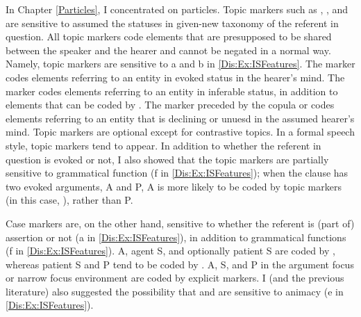 In Chapter \ref{Particles},
I concentrated on particles.
Topic markers such as , , and 
are sensitive to assumed the statuses in given-new taxonomy of the referent in question.
All topic markers code elements that are presupposed to be
shared between the speaker and the hearer
and cannot be negated in a normal way.
Namely, topic markers are sensitive to
a and b in \ref{Dis:Ex:ISFeatures}.
The marker  codes elements referring to an entity in evoked status in the hearer's mind.
The marker  codes elements referring to an entity in inferable status,
in addition to elements that can be coded by .
The marker  preceded by the copula  or 
codes elements referring to an entity that is declining or unuesd in the assumed hearer's mind.
Topic markers are optional except for contrastive topics.
In a formal speech style,
topic markers tend to appear.
In addition to whether the referent in question is evoked or not,
I also showed that the topic markers are partially sensitive to grammatical function (f in \ref{Dis:Ex:ISFeatures});
when the clause has two evoked arguments, A and P,
A is more likely to be coded by topic markers (in this case, ),
rather than P.

Case markers are, on the other hand, sensitive to whether the referent is (part of) assertion or not (a in \ref{Dis:Ex:ISFeatures}),
in addition to grammatical functions (f in \ref{Dis:Ex:ISFeatures}).
A, agent S, and optionally patient S are coded by ,
whereas patient S and P tend to be coded by \ci{\O}.
A, S, and P in the argument focus or narrow focus environment are coded by explicit markers.
I (and the previous literature) also suggested the possibility that
 and  are sensitive to animacy (e in \ref{Dis:Ex:ISFeatures}).

